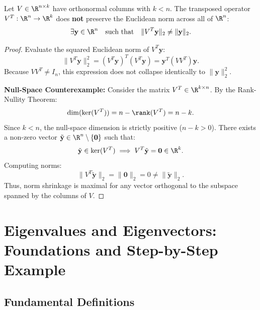 \begin{proposition}
\label{prop:left-non-isometry}
Let $V \in \R^{n \times k}$ have orthonormal columns with $k < n$. The transposed operator $V^T: \R^n \to \R^k$ does \textbf{not} preserve the Euclidean norm across all of $\R^n$:
\begin{equation}
    \exists \mathbf{y} \in \R^n \quad \text{such that} \quad \|V^T \mathbf{y}\|_2 \neq \|\mathbf{y}\|_2.
\end{equation}
\end{proposition}

\begin{proof}
Evaluate the squared Euclidean norm of $V^T \mathbf{y}$:
\begin{equation}
    \|V^T \mathbf{y}\|_2^2 = (V^T \mathbf{y})^T (V^T \mathbf{y}) = \mathbf{y}^T (V V^T) \mathbf{y}.
\end{equation}
Because $V V^T \neq I_n$, this expression does not collapse identically to $\|\mathbf{y}\|_2^2$.

\medskip
\noindent\textbf{Null-Space Counterexample:}
Consider the matrix $V^T \in \R^{k \times n}$. By the Rank-Nullity Theorem:
\begin{equation}
    \dim(\ker(V^T)) = n - \rank(V^T) = n - k.
\end{equation}
Since $k < n$, the null-space dimension is strictly positive ($n - k > 0$). There exists a non-zero vector $\tilde{\mathbf{y}} \in \R^n \setminus \{\mathbf{0}\}$ such that:
\begin{equation}
    \tilde{\mathbf{y}} \in \ker(V^T) \implies V^T \tilde{\mathbf{y}} = \mathbf{0} \in \R^k.
\end{equation}
Computing norms:
\begin{equation}
    \|V^T \tilde{\mathbf{y}}\|_2 = \|\mathbf{0}\|_2 = 0 \neq \|\tilde{\mathbf{y}}\|_2.
\end{equation}
Thus, norm shrinkage is maximal for any vector orthogonal to the subspace spanned by the columns of $V$.
\end{proof}

\FloatBarrier
\section{Eigenvalues and Eigenvectors: Foundations and Step-by-Step Example}

\subsection{Fundamental Definitions}

